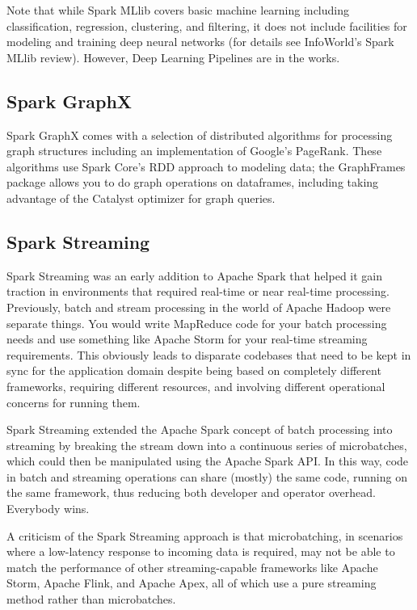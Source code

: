 \documentclass[a4paper,12pt]{article}
\begin{document}
Note that while Spark MLlib covers basic machine learning including classification, regression, clustering, and filtering, it does not include facilities for modeling and training deep neural networks (for details see InfoWorld’s Spark MLlib review). However, Deep Learning Pipelines are in the works.

\subsection{Spark GraphX}

Spark GraphX comes with a selection of distributed algorithms for processing graph structures including an implementation of Google’s PageRank. These algorithms use Spark Core’s RDD approach to modeling data; the GraphFrames package allows you to do graph operations on dataframes, including taking advantage of the Catalyst optimizer for graph queries.

\subsection{Spark Streaming}

Spark Streaming was an early addition to Apache Spark that helped it gain traction in environments that required real-time or near real-time processing. Previously, batch and stream processing in the world of Apache Hadoop were separate things. You would write MapReduce code for your batch processing needs and use something like Apache Storm for your real-time streaming requirements. This obviously leads to disparate codebases that need to be kept in sync for the application domain despite being based on completely different frameworks, requiring different resources, and involving different operational concerns for running them.

Spark Streaming extended the Apache Spark concept of batch processing into streaming by breaking the stream down into a continuous series of microbatches, which could then be manipulated using the Apache Spark API. In this way, code in batch and streaming operations can share (mostly) the same code, running on the same framework, thus reducing both developer and operator overhead. Everybody wins.

A criticism of the Spark Streaming approach is that microbatching, in scenarios where a low-latency response to incoming data is required, may not be able to match the performance of other streaming-capable frameworks like Apache Storm, Apache Flink, and Apache Apex, all of which use a pure streaming method rather than microbatches.
\end{document}

